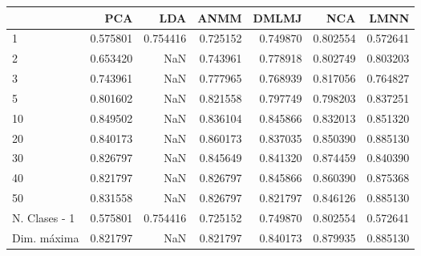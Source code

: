 \begin{tabular}{lrrrrrr}
\toprule
{} &       PCA &       LDA &      ANMM &     DMLMJ &       NCA &      LMNN \\
\midrule
1             &  0.575801 &  0.754416 &  0.725152 &  0.749870 &  0.802554 &  0.572641 \\
2             &  0.653420 &       NaN &  0.743961 &  0.778918 &  0.802749 &  0.803203 \\
3             &  0.743961 &       NaN &  0.777965 &  0.768939 &  0.817056 &  0.764827 \\
5             &  0.801602 &       NaN &  0.821558 &  0.797749 &  0.798203 &  0.837251 \\
10            &  0.849502 &       NaN &  0.836104 &  0.845866 &  0.832013 &  0.851320 \\
20            &  0.840173 &       NaN &  0.860173 &  0.837035 &  0.850390 &  0.885130 \\
30            &  0.826797 &       NaN &  0.845649 &  0.841320 &  0.874459 &  0.840390 \\
40            &  0.821797 &       NaN &  0.826797 &  0.845866 &  0.860390 &  0.875368 \\
50            &  0.831558 &       NaN &  0.826797 &  0.821797 &  0.846126 &  0.885130 \\
N. Clases - 1 &  0.575801 &  0.754416 &  0.725152 &  0.749870 &  0.802554 &  0.572641 \\
Dim. máxima   &  0.821797 &       NaN &  0.821797 &  0.840173 &  0.879935 &  0.885130 \\
\bottomrule
\end{tabular}
